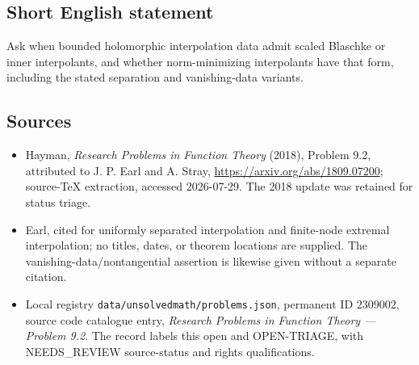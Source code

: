 \documentclass[11pt]{article}
\begin{document}
\subsection{Short English statement}
Ask when bounded holomorphic interpolation data admit scaled Blaschke or inner interpolants, and whether norm-minimizing interpolants have that form, including the stated separation and vanishing-data variants.
\subsection{Sources}
\begin{itemize}
\item Hayman, \emph{Research Problems in Function Theory} (2018), Problem 9.2, attributed to J. P. Earl and A. Stray, \url{https://arxiv.org/abs/1809.07200}; source-TeX extraction, accessed 2026-07-29. The 2018 update was retained for status triage.
\item Earl, cited for uniformly separated interpolation and finite-node extremal interpolation; no titles, dates, or theorem locations are supplied. The vanishing-data/nontangential assertion is likewise given without a separate citation.
\item Local registry \texttt{data/unsolvedmath/problems.json}, permanent ID $2309002$, source code catalogue entry, \emph{Research Problems in Function Theory --- Problem 9.2}. The record labels this open and OPEN-TRIAGE, with NEEDS\_REVIEW source-status and rights qualifications.
\end{itemize}
\end{document}
